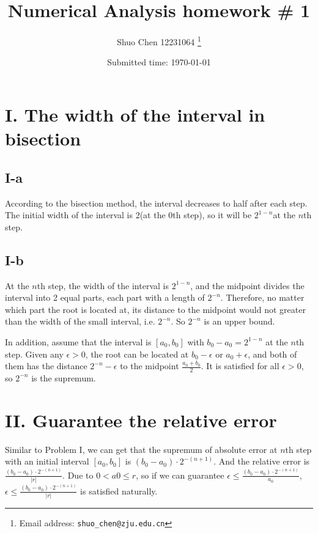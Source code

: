 \documentclass[a4paper]{article}
\begin{document}
\title{Numerical Analysis homework \# 1}

\author{Shuo Chen 12231064
  \thanks{Email address: \texttt{shuo\_chen@zju.edu.cn}}}


\date{Submitted time: \today}

\maketitle
\section*{I. The width of the interval in bisection}

\subsection*{I-a}
According to the bisection method, the interval decreases to half after each step. The initial width of the interval is 2(at the 0th step), so it will be $2^{1-n}$at the $n$th step.


\subsection*{I-b}
At the $n$th step, the width of the interval is $2^{1-n}$, and the midpoint divides the interval into 2 equal parts, each part with a length of $2^{-n}$. Therefore, no matter which part the root is located at, its distance to the midpoint would not greater than the width of the small interval, i.e. $2^{-n}$. So $2^{-n}$ is an upper bound.

In addition, assume that the interval is $\left[a_0,b_0\right]$ with $b_0-a_0=2^{1-n}$ at the $n$th step. Given any $\epsilon > 0$, the root can be located at $b_0-\epsilon$ or $a_0+\epsilon$, and both of them has the distance $2^{-n}-\epsilon$ to the midpoint $\frac{a_0+b_0}{2}$. It is satisfied for all $\epsilon > 0$, so $2^{-n}$ is the supremum.
\section*{II. Guarantee the relative error}
Similar to Problem I, we can get that the supremum of absolute error at $n$th step with an initial interval $\left[a_0,b_0\right]$ is $(b_0-a_0)\cdot 2^{-(n+1)}$. And the relative error is $\frac{(b_0-a_0)\cdot 2^{-(n+1)}}{|r|}$. Due to $0 < a0 \leq r$, so if we can guarantee $\epsilon \leq \frac{(b_0-a_0)\cdot 2^{-(n+1)}}{a_0}$, $\epsilon \leq \frac{(b_0-a_0)\cdot 2^{-(n+1)}}{|r|}$ is satisfied naturally.
\end{document}
